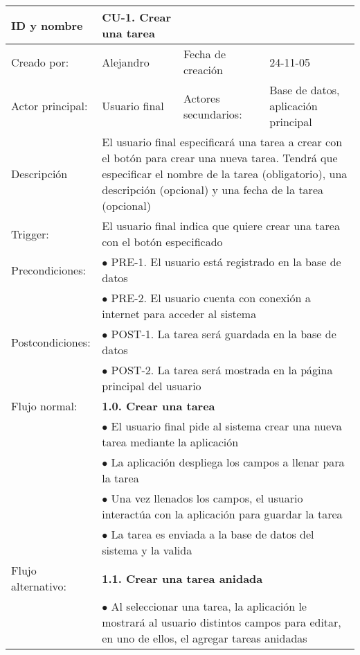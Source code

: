 \begin{longtable}[c]{p{3cm}p{5cm}p{4cm}p{2cm}}
  \endfirsthead
  \endhead
  \endfoot
  \hline
  ID y nombre & CU-1. Crear una tarea & & \\
  \hline
  Creado por: & Alejandro & Fecha de creaci\'on & 24-11-05\\
  \hline
  Actor principal: & Usuario final & Actores secundarios: & Base de datos, aplicaci\'on principal\\
  \hline
  Descripci\'on & \multicolumn{3}{p{11cm}}{El usuario final especificar\'a una tarea a crear con el bot\'on para crear una nueva tarea. Tendr\'a que especificar el nombre de la tarea (obligatorio), una descripci\'on (opcional) y una fecha de la tarea (opcional)}\\
  \hline
  Trigger: & \multicolumn{3}{p{11cm}}{El usuario final indica que quiere crear una tarea con el bot\'on especificado}\\
  \hline
  Precondiciones: & \multicolumn{3}{p{11cm}}{$\bullet$ PRE-1. El usuario est\'a registrado en la base de datos}\\
		  & \multicolumn{3}{p{11cm}}{$\bullet$ PRE-2. El usuario cuenta con conexi\'on a internet para acceder al sistema}\\
  \hline
  Postcondiciones: & \multicolumn{3}{p{11cm}}{$\bullet$ POST-1. La tarea ser\'a guardada en la base de datos}\\
		   & \multicolumn{3}{p{11cm}}{$\bullet$ POST-2. La tarea ser\'a mostrada en la p\'agina principal del usuario}\\
  \hline
  Flujo normal: & \multicolumn{3}{p{11cm}}{\textbf{1.0. Crear una tarea}}\\
		& \multicolumn{3}{p{11cm}}{$\bullet$ El usuario final pide al sistema crear una nueva tarea mediante la aplicaci\'on}\\
		& \multicolumn{3}{p{11cm}}{$\bullet$ La aplicaci\'on despliega los campos a llenar para la tarea}\\
		& \multicolumn{3}{p{11cm}}{$\bullet$ Una vez llenados los campos, el usuario interact\'ua con la aplicaci\'on para guardar la tarea}\\
		& \multicolumn{3}{p{11cm}}{$\bullet$ La tarea es enviada a la base de datos del sistema y la valida}\\
  \hline
  Flujo alternativo: & \multicolumn{3}{p{11cm}}{\textbf{1.1. Crear una tarea anidada}}\\
		     & \multicolumn{3}{p{11cm}}{$\bullet$ Al seleccionar una tarea, la aplicaci\'on le mostrar\'a al usuario distintos campos para editar, en uno de ellos, el agregar tareas anidadas}\\

\end{longtable}
